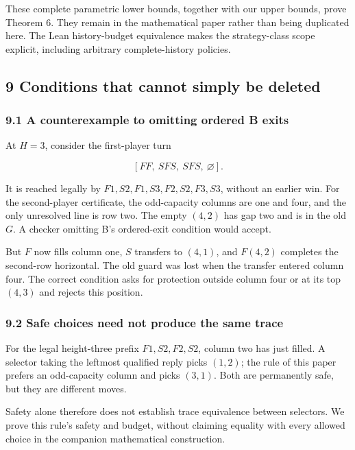 \documentclass[
  a4paper,
]{article}
\begin{document}
These complete parametric lower bounds, together with our upper bounds,
prove Theorem 6. They remain in the mathematical paper rather than being
duplicated here. The Lean history-budget equivalence makes the
strategy-class scope explicit, including arbitrary complete-history
policies.

\subsection{9 Conditions that cannot simply be
deleted}\label{conditions-that-cannot-simply-be-deleted}

\subsubsection{9.1 A counterexample to omitting ordered B
exits}\label{a-counterexample-to-omitting-ordered-b-exits}

At \(H=3\), consider the first-player turn

\[[FF,\ SFS,\ SFS,\ \varnothing].\]

It is reached legally by \(F1,S2,F1,S3,F2,S2,F3,S3\), without an earlier
win. For the second-player certificate, the odd-capacity columns are one
and four, and the only unresolved line is row two. The empty \((4,2)\)
has gap two and is in the old \(G\). A checker omitting B's ordered-exit
condition would accept.

But \(F\) now fills column one, \(S\) transfers to \((4,1)\), and
\(F(4,2)\) completes the second-row horizontal. The old guard was lost
when the transfer entered column four. The correct condition asks for
protection outside column four or at its top \((4,3)\) and rejects this
position.

\subsubsection{9.2 Safe choices need not produce the same
trace}\label{safe-choices-need-not-produce-the-same-trace}

For the legal height-three prefix \(F1,S2,F2,S2\), column two has just
filled. A selector taking the leftmost qualified reply picks \((1,2)\);
the rule of this paper prefers an odd-capacity column and picks
\((3,1)\). Both are permanently safe, but they are different moves.

Safety alone therefore does not establish trace equivalence between
selectors. We prove this rule's safety and budget, without claiming
equality with every allowed choice in the companion mathematical
construction.
\end{document}
